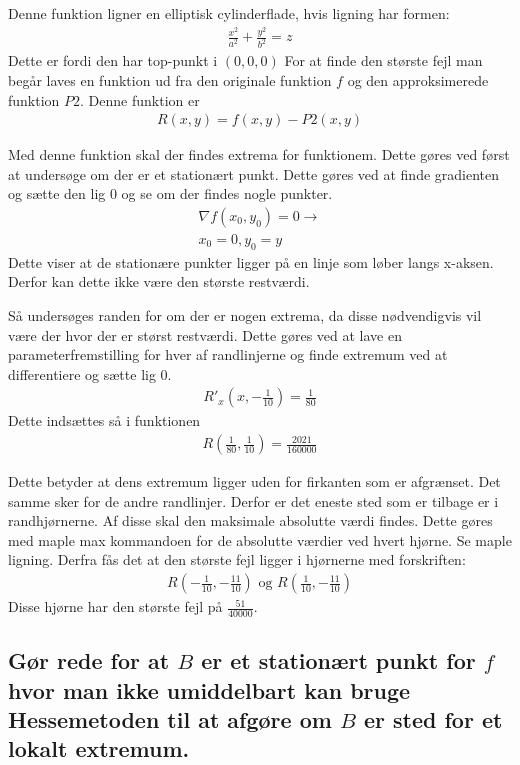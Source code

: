 Denne funktion ligner en elliptisk cylinderflade, hvis ligning har formen:
\begin{align}
    \frac{x^2}{a^2} + \frac{y^2}{b^2} = z
\end{align}
Dette er fordi den har top-punkt i $(0,0,0)$
For at finde den største fejl man begår laves en funktion ud fra den originale funktion $f$ og den approksimerede funktion $P2$. Denne funktion er
\begin{align}
    R(x,y) = f(x,y)-P2(x,y)
\end{align}

Med denne funktion skal der findes extrema for funktionem. Dette gøres ved først at undersøge om der er et stationært punkt. Dette gøres ved at finde gradienten og sætte den lig 0 og se om der findes nogle punkter. 
\begin{align}
    \nabla f(x_0,y_0) = 0 \rightarrow \\
    x_0 = 0, y_0 = y
\end{align}
Dette viser at de stationære punkter ligger på en linje som løber langs x-aksen. Derfor kan dette ikke være den største restværdi.

Så undersøges randen for om der er nogen extrema, da disse nødvendigvis vil være der hvor der er størst restværdi. Dette gøres ved at lave en parameterfremstilling for hver af randlinjerne og finde extremum ved at differentiere og sætte lig 0.
\begin{align}
    R'_x \left( x,-\frac{1}{10} \right)=\frac{1}{80}
\end{align}
Dette indsættes så i funktionen
\begin{align}
    R\left(\frac{1}{80},\frac{1}{10} \right)=\frac{2021}{160000}
\end{align}

Dette betyder at dens extremum ligger uden for firkanten som er afgrænset. Det samme sker for de andre randlinjer. Derfor er det eneste sted som er tilbage er i randhjørnerne. Af disse skal den maksimale absolutte værdi findes. Dette gøres med maple max kommandoen for de absolutte værdier ved hvert hjørne. Se maple ligning.
Derfra fås det at den største fejl ligger i hjørnerne med forskriften:
\begin{align}
    R\left(-\frac{1}{10},-\frac{11}{10} \right) \text{ og } R \left(\frac{1}{10},-\frac{11}{10}\right)
\end{align}
Disse hjørne har den største fejl på $\frac{51}{40000}$.
\newpage
\subsection{Gør rede for at $B$ er et stationært punkt for $f$ hvor man ikke umiddelbart kan bruge Hessemetoden til at afgøre om $B$ er sted for et lokalt extremum.}

